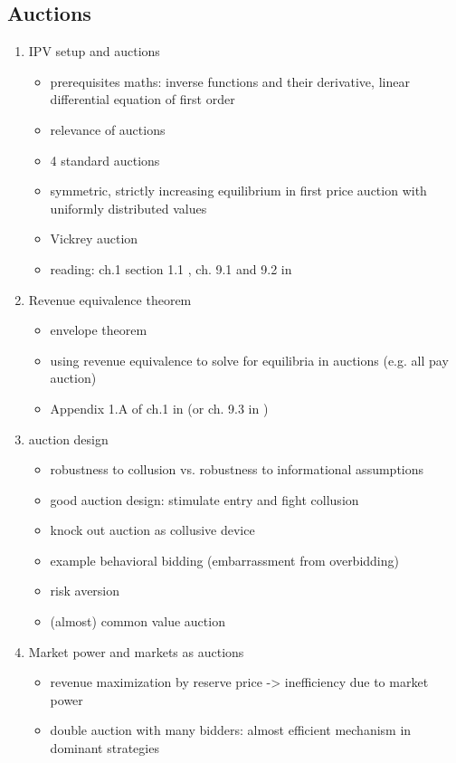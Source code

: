 \documentclass[11pt]{article}
\begin{document}
\subsection{Auctions}
\label{sec:org4713f37}
\begin{enumerate}
\item IPV setup and auctions
\label{sec:orgda5ccfc}
\begin{itemize}
\item prerequisites maths: inverse functions and their derivative, linear differential equation of first order
\item relevance of auctions
\item 4 standard auctions
\item symmetric, strictly increasing equilibrium in first price auction with uniformly distributed values
\item Vickrey auction
\item reading: ch.1 section 1.1 \cite{klemperer2004auctions}, ch. 9.1 and 9.2 in \cite{jehle2001advanced}
\end{itemize}
\item Revenue equivalence theorem
\label{sec:org380581c}
\begin{itemize}
\item envelope theorem
\item using revenue equivalence to solve for equilibria in auctions (e.g. all pay auction)
\item Appendix 1.A of ch.1  in \cite{klemperer2004auctions} (or ch. 9.3 in \cite{jehle2001advanced})
\end{itemize}
\item auction design
\label{sec:org16a970c}
\begin{itemize}
\item robustness to collusion vs. robustness to informational assumptions
\item good auction design: stimulate entry and fight collusion
\item knock out auction as collusive device
\item example behavioral bidding (embarrassment from overbidding)
\item risk aversion
\item (almost) common value auction
\end{itemize}
\item Market power and markets as auctions
\label{sec:org69fdb11}
\begin{itemize}
\item revenue maximization by reserve price -> inefficiency due to market power
\item double auction with many bidders: almost efficient mechanism in dominant strategies
\end{itemize}
\end{enumerate}
\end{document}
